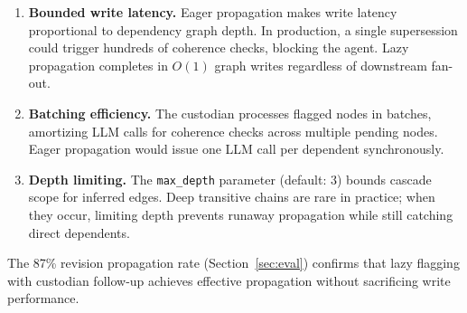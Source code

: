 \documentclass[11pt,letterpaper]{article}
\begin{document}
\begin{enumerate}[noitemsep]
    \item \textbf{Bounded write latency.} Eager propagation makes write latency proportional to dependency graph depth. In production, a single supersession could trigger hundreds of coherence checks, blocking the agent. Lazy propagation completes in $O(1)$ graph writes regardless of downstream fan-out.

    \item \textbf{Batching efficiency.} The custodian processes flagged nodes in batches, amortizing LLM calls for coherence checks across multiple pending nodes. Eager propagation would issue one LLM call per dependent synchronously.

    \item \textbf{Depth limiting.} The \texttt{max\_depth} parameter (default: 3) bounds cascade scope for inferred edges. Deep transitive chains are rare in practice; when they occur, limiting depth prevents runaway propagation while still catching direct dependents.
\end{enumerate}

The 87\% revision propagation rate (Section~\ref{sec:eval}) confirms that lazy flagging with custodian follow-up achieves effective propagation without sacrificing write performance.
\end{document}
